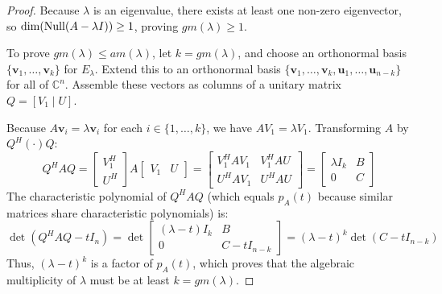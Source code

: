 \begin{proof}
Because $\lambda$ is an eigenvalue, there exists at least one non-zero eigenvector, so $\dim(\operatorname{Null}(A - \lambda I)) \ge 1$, proving $gm(\lambda) \ge 1$.

To prove $gm(\lambda) \le am(\lambda)$, let $k = gm(\lambda)$, and choose an orthonormal basis $\{\mathbf{v}_1, \dots, \mathbf{v}_k\}$ for $E_\lambda$. Extend this to an orthonormal basis $\{\mathbf{v}_1, \dots, \mathbf{v}_k, \mathbf{u}_1, \dots, \mathbf{u}_{n-k}\}$ for all of $\mathbb{C}^n$. Assemble these vectors as columns of a unitary matrix $Q = [V_1 \mid U]$.

Because $A\mathbf{v}_i = \lambda \mathbf{v}_i$ for each $i \in \{1, \dots, k\}$, we have $A V_1 = \lambda V_1$.
Transforming $A$ by $Q^H (\cdot) Q$:
\begin{equation}
Q^H A Q = \begin{bmatrix} V_1^H \\ U^H \end{bmatrix} A \begin{bmatrix} V_1 & U \end{bmatrix} = \begin{bmatrix} V_1^H A V_1 & V_1^H A U \\ U^H A V_1 & U^H A U \end{bmatrix} = \begin{bmatrix} \lambda I_k & B \\ 0 & C \end{bmatrix}
\end{equation}
The characteristic polynomial of $Q^H A Q$ (which equals $p_A(t)$ because similar matrices share characteristic polynomials) is:
\begin{equation}
\det(Q^H A Q - t I_n) = \det\begin{bmatrix} (\lambda - t)I_k & B \\ 0 & C - t I_{n-k} \end{bmatrix} = (\lambda - t)^k \det(C - t I_{n-k})
\end{equation}
Thus, $(\lambda - t)^k$ is a factor of $p_A(t)$, which proves that the algebraic multiplicity of $\lambda$ must be at least $k = gm(\lambda)$.
\end{proof}

